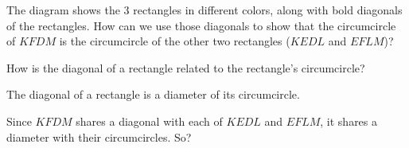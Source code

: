 The diagram shows the 3 rectangles in different colors, along with bold diagonals of the rectangles. How can we use those diagonals to show that the circumcircle of $KFDM$ is the circumcircle of the other two rectangles ($KEDL$ and $EFLM$)?

How is the diagonal of a rectangle related to the rectangle's circumcircle?













The diagonal of a rectangle is a diameter of its circumcircle.

Since $KFDM$ shares a diagonal with each of $KEDL$ and $EFLM$, it shares a diameter with their circumcircles. So?




